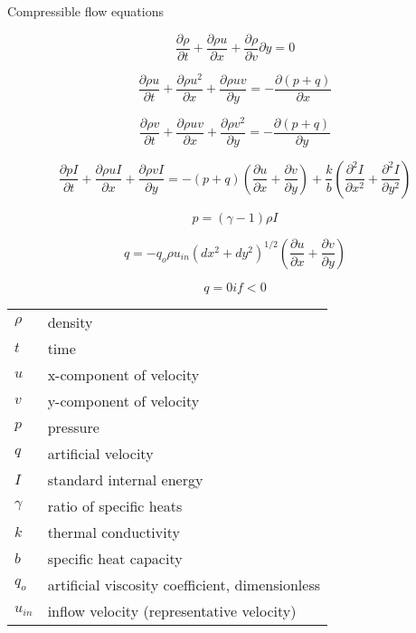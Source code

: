\documentclass[english]{article}
\begin{document}
Compressible flow equations

\[\frac{\partial \rho}{\partial t} + \frac{\partial \rho u}{\partial x}
+ \frac{\partial \rho}{\partial v}{\partial y} = 0\]

\[\frac{\partial \rho u}{\partial t} + \frac{\partial \rho u^{2}}{\partial x} 
+ \frac{\partial \rho u v}{\partial y} = - \frac{\partial(p + q)}{\partial x}\]

\[\frac{\partial \rho v}{\partial t} + \frac{\partial \rho u v}{\partial x} 
+ \frac{\partial \rho v^{2}}{\partial y} = - \frac{\partial(p + q)}{\partial y}\]

\[\frac{\partial p I}{\partial t} + \frac{\partial \rho u I}{\partial x} +
\frac{\partial \rho v I}{\partial y} = -(p + q)\left(\frac{\partial u}
{\partial x} + \frac{\partial v}{\partial y}\right) + \frac{k}{b}\left(
\frac{\partial^{2}I}{\partial x^{2}} + \frac{\partial^{2}I}{\partial y^{2}}\right)\]

\[p = (\gamma - 1)\rho I\]

\[q = -q_{o}\rho u_{in}(dx^{2} + dy^{2})^{1/2} \left(\frac{\partial u}
{\partial x} + \frac{\partial v}{\partial y}\right)\]

\[q = 0 if < 0\]

\begin{tabular}{ll}
$\rho$ & density \\
$t$ & time \\
$u$ & x-component of velocity \\
$v$ & y-component of velocity\\
$p$ & pressure\\
$q$ & artificial velocity\\
$I$ & standard internal energy\\
$\gamma$ & ratio of specific heats\\
$k$ & thermal conductivity\\
$b$ & specific heat capacity\\
$q_{o}$ & artificial viscosity coefficient, dimensionless\\
$u_{in}$ & inflow velocity (representative velocity)\\
\end{tabular}
\end{document}
